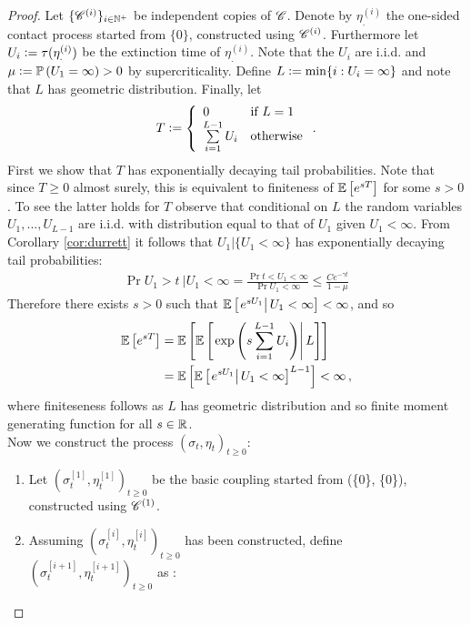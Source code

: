 \begin{proof}
Let $\{ \mathscr{C}^{(i)}\}_{i \in \mathbb{N}^+}$ be independent copies of $\mathscr{C}$. Denote by $\eta^{(i)}_.$ the one-sided contact process started from $\{0\}$, constructed using $\mathscr{C}^{(i)}$. Furthermore let $U_i \vcentcolon= \tau(\eta^{(i)}_.)$ be the extinction time of $\eta^{(i)}_.$. Note that the $U_i$ are i.i.d. and $\mu \vcentcolon= \mathbb{P} \left( U_1 = \infty \right) > 0$ by supercriticality. Define $L \vcentcolon= \min \{ i: U_i = \infty \}$ and note that $L$ has geometric distribution. Finally, let 
\[
T \vcentcolon= 
\left\{
  \begin{array}{ll}
    0                           & \mbox{if } L = 1 \\
    \sum\limits^{L-1}_{i=1} U_i & \mbox{otherwise}
  \end{array}
\right..
\]
First we show that $T$ has exponentially decaying tail probabilities. Note that since $T \geq 0$ almost surely, this is equivalent to finiteness of $\mathbb{E}\left[ e^{s T} \right]$ for some $s > 0$. To see the latter holds for $T$ observe that conditional on $L$ the random variables $U_1, ..., U_{L-1}$ are i.i.d. with distribution equal to that of $U_1$ given $U_1 < \infty$. From Corollary \ref{cor:durrett} it follows that $U_1 | \{U_1 < \infty \}$ has exponentially decaying tail probabilities:
\begin{align*}
\Pr{U_1 > t\ | U_1 < \infty} = \frac{\Pr{t < U_1 < \infty}}{\Pr{U_1 < \infty}} \leq \frac{C e^{- \gamma t}}{1 - \mu}
\end{align*}
Therefore there exists $s > 0$ such that $\mathbb{E} \left[\left. e^{sU_1} \right| U_1 < \infty \right] < \infty$, and so
\begin{align*}
\mathbb{E}\left[ e^{sT} \right] &= \mathbb{E}\left[ \mathbb{E} \left[\left. \exp\left(s\sum\limits_{i=1}^{L-1} U_i \right) \right| L \right] \right] \\
            &= \mathbb{E}\left[ \mathbb{E} \left[\left. e^{s U_1} \right| U_1 < \infty \right]^{L-1} \right] < \infty \,,
\end{align*}
where finiteseness follows as $L$ has geometric distribution and so finite moment generating function for all $s \in \mathbb{R}$. \\
Now we construct the process $(\sigma_t, \eta_t)_{t \geq 0}$:
\begin{enumerate}
  \item Let $(\sigma^{[1]}_t, \eta^{[1]}_t)_{t \geq 0}$ be the basic coupling started from (\{0\}, \{0\}), constructed using $\mathscr{C}^{(1)}$. 
  \item Assuming $(\sigma^{[i]}_t, \eta^{[i]}_t)_{t \geq 0}$ has been constructed, define $(\sigma^{[i+1]}_t, \eta^{[i+1]}_t)_{t \geq 0}$ as :
  \begin{itemize}

\end{itemize}
\end{enumerate}
\end{proof}
